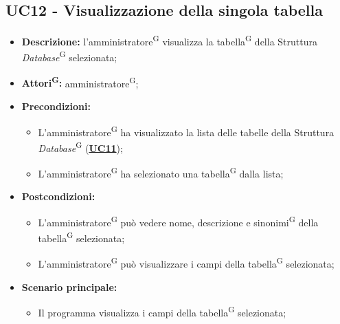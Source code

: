 \subsection{UC12 - Visualizzazione della singola tabella}
\label{sec:UC12}
\begin{itemize}
	\item \textbf{Descrizione:} l’amministratore\textsuperscript{G} visualizza la tabella\textsuperscript{G} della Struttura \textit{Database}\textsuperscript{G} selezionata;
	\item \textbf{Attori\textsuperscript{G}:} amministratore\textsuperscript{G};
	\item \textbf{Precondizioni:} 
	\begin{itemize}
		\item L'amministratore\textsuperscript{G} ha visualizzato la lista delle tabelle della Struttura \textit{Database}\textsuperscript{G} (\hyperref[sec:UC11]{\textbf{UC11}});
		\item L'amministratore\textsuperscript{G} ha selezionato una tabella\textsuperscript{G} dalla lista;
	\end{itemize}
	\item \textbf{Postcondizioni:} 
	\begin{itemize}
		\item L'amministratore\textsuperscript{G} può vedere nome, descrizione e sinonimi\textsuperscript{G} della tabella\textsuperscript{G} selezionata;
		\item L'amministratore\textsuperscript{G} può visualizzare i campi della tabella\textsuperscript{G} selezionata;
	\end{itemize}
	\item \textbf{Scenario principale:} 
	\begin{itemize}
		\item Il programma visualizza i campi della tabella\textsuperscript{G} selezionata;
	\end{itemize}
\end{itemize}

